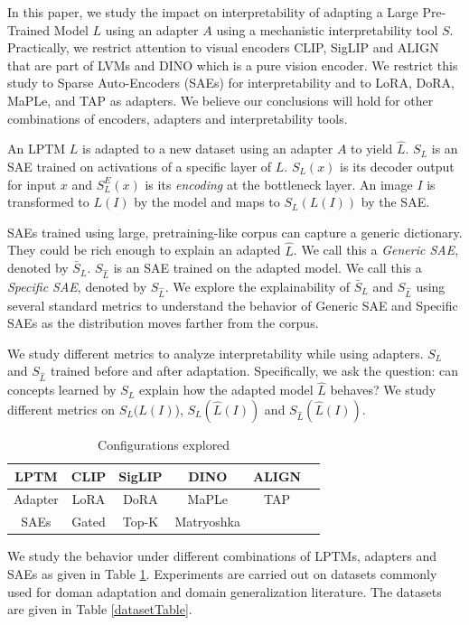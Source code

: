 
In this paper, we study the impact on interpretability of adapting a Large Pre-Trained Model $L$ using an adapter $A$ using a mechanistic interpretability tool $S$. Practically, we restrict attention to visual encoders CLIP, SigLIP and ALIGN that are part of LVMs and DINO which is a pure vision encoder. We restrict this study to Sparse Auto-Encoders (SAEs) for interpretability and to LoRA, DoRA, MaPLe, and TAP as adapters. We believe our conclusions will hold for other combinations of encoders, adapters and interpretability tools.

An LPTM $L$ is adapted to a new dataset using an adapter $A$ to yield $\hat{L}$. $S_L$ is an SAE trained on activations of a specific layer of $L$. $S_L(x)$ is its decoder output for input $x$ and $S_L^E(x)$ is its {\em encoding} at the bottleneck layer. An image $I$ is transformed to $L(I)$ by the model and maps to $S_L(L(I))$ by the SAE.

SAEs trained using large, pretraining-like corpus can capture a generic dictionary. They could be rich enough to explain an adapted $\hat L$. We call this a {\em Generic SAE}, denoted by $\bar S_L$. $S_{\hat L}$ is an SAE trained on the adapted model. We call this a {\em Specific SAE}, denoted by $S_{\hat L}$. We explore the explainability of $\bar S_L$ and $S_{\hat L}$ using several standard metrics to understand the behavior of Generic SAE and Specific SAEs as the distribution moves farther from the corpus.

We study different metrics to analyze interpretability while using adapters. $S_L$ and $S_{\hat{L}}$ trained before and after adaptation. Specifically, we ask the question: can concepts learned by $S_L$ explain how the adapted model $\hat L$ behaves? We study different metrics on $S_L(L(I)$), $S_L(\hat{L}(I))$ and $S_{\hat L}(\hat{L}(I))$.

\begin{table}[h]
    \centering
    \begin{tabular}{|c||c|c|c|c|c|}
    \hline
        LPTM & CLIP & SigLIP & DINO & ALIGN & \\
    \hline
        Adapter & LoRA & DoRA & MaPLe & TAP & \\
    \hline
        SAEs & Gated & Top-K & Matryoshka && \\
    \hline
    \end{tabular}
    \caption{Configurations explored}
    \label{configTable}
\end{table}

We study the behavior under different combinations of LPTMs, adapters and SAEs as given in Table \ref{configTable}. Experiments are carried out on datasets commonly used for doman adaptation and domain generalization literature. The datasets are given in Table \ref{datasetTable}.


